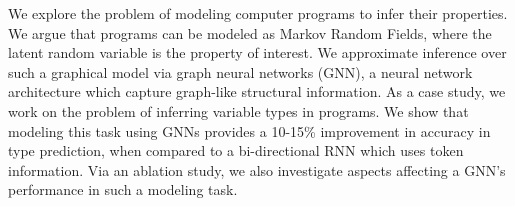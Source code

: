 We explore the problem of modeling computer programs to infer their properties. We argue that programs can be modeled as Markov Random Fields, where the latent random variable is the property of interest. We approximate inference over such a graphical model via graph neural networks (GNN), a neural network architecture which capture graph-like structural information. As a case study, we work on the problem of inferring variable types in programs. We show that modeling this task using GNNs provides a 10-15\% improvement in accuracy in type prediction, when compared to a bi-directional RNN which uses token information. Via an ablation study, we also investigate aspects affecting a GNN's performance in such a modeling task.

